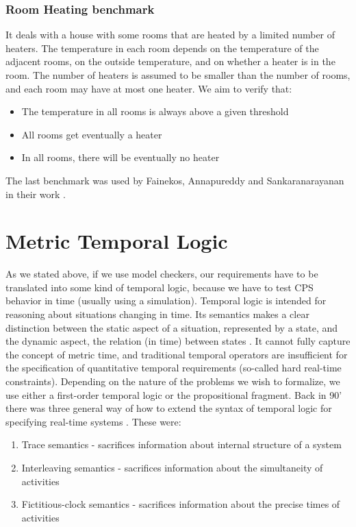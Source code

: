\subsubsection{Room Heating benchmark}

It deals with a house with some rooms that are heated by a limited number of heaters. The temperature in each room depends on the temperature of the adjacent rooms, on the outside temperature, and on whether a heater is in the room. The number of heaters is assumed to be smaller than the number of rooms, and each room may have at most one heater. We aim to verify that:

\begin{itemize}
    \item The temperature in all rooms is always above a given threshold
    \item All rooms get eventually a heater
    \item In all rooms, there will be eventually no heater
\end{itemize}

The last benchmark was used by Fainekos, Annapureddy and Sankaranarayanan in their work \cite{Fainekos:sTaLiRo}.

\section{Metric Temporal Logic}

As we stated above, if we use model checkers, our requirements have to be translated into some kind of temporal logic, because we have to test CPS behavior in time (usually using a simulation). Temporal logic is intended for reasoning about situations changing in time. Its semantics makes a clear distinction between the static aspect of a situation, represented by a state, and the dynamic aspect, the relation (in time) between states \cite{Koymans:MTL}. It cannot fully capture the concept of metric time, and traditional temporal operators are insufficient for the specification of quantitative temporal requirements (so-called hard real-time constraints). Depending on the nature of the problems we wish to formalize, we use either a first-order temporal logic or the propositional fragment. Back in 90’ there was three general way of how to extend the syntax of temporal logic for specifying real-time systems \cite{Rajeev:ModelsOfRealTime}. These were:

\begin{enumerate}
    \item Trace semantics - sacrifices information about internal structure of a system
    \item Interleaving semantics - sacrifices information about the simultaneity of activities
    \item Fictitious-clock semantics - sacrifices information about the precise times of activities
\end{enumerate}

